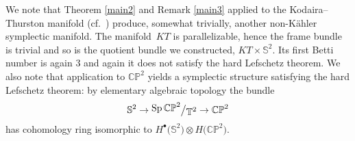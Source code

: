 \documentclass[10pt,a4paper]{amsart}
\numberwithin{equation}{section}
\newcommand{\bigslant}[2]{{\raisebox{.2em}{$#1$}\big/\raisebox{-.2em}{$#2$}}}
\begin{document}
We note that Theorem \ref{main2} and Remark \ref{main3} applied to the Kodaira--Thurston manifold (cf.~\cite{thurston}) produce, somewhat trivially, another non-K\"ahler symplectic manifold. The mani\-fold~$KT$ is parallelizable, hence the frame bundle is trivial and so is the quotient bundle we constructed, $KT\times\mathbb{S}^2$. Its first Betti number is again 3 and again it does not satisfy the hard Lefschetz theorem. We also note that application to $\mathbb{CP}^2$ yields a symplectic structure satisfying the hard Lefschetz theorem: by elementary algebraic topology the bundle
\begin{gather*}
\mathbb{S}^2 \to \bigslant{\operatorname{Sp}\mathbb{CP}^2}{\mathbb{T}^2} \to \mathbb{CP}^2
\end{gather*}
has cohomology ring isomorphic to $H^{\bullet}\big(\mathbb{S}^2\big)\otimes H\big(\mathbb{CP}^2\big)$.

\end{document}
